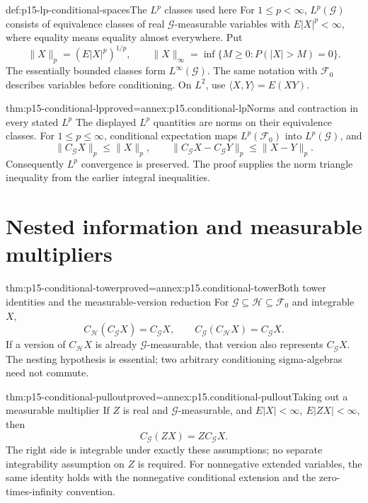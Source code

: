 \begin{hbdefinition}{def:p15-lp-conditional-spaces}{The \(L^p\) classes used here}
For \(1\leq p<\infty\), \(L^p(\mathcal G)\) consists of equivalence
classes of real \(\mathcal G\)-measurable variables with \(E|X|^p<\infty\),
where equality means equality almost everywhere. Put
\[
       \|X\|_p=(E|X|^p)^{1/p},\qquad
       \|X\|_\infty=\inf\{M\geq0:P(|X|>M)=0\}.
\]
The essentially bounded classes form \(L^\infty(\mathcal G)\).
The same notation with \(\mathcal F_0\) describes variables before
conditioning. On \(L^2\), use \(\langle X,Y\rangle=E(XY)\).
\end{hbdefinition}

\begin{hbtheorem}{thm:p15-conditional-lp}{proved=annex:p15.conditional-lp}{Norms and contraction in every stated \(L^p\)}
The displayed \(L^p\) quantities are norms on their equivalence classes.
For \(1\leq p\leq\infty\), conditional expectation maps
\(L^p(\mathcal F_0)\) into \(L^p(\mathcal G)\), and
\[
      \|C_{\mathcal G}X\|_p\leq\|X\|_p,\qquad
      \|C_{\mathcal G}X-C_{\mathcal G}Y\|_p\leq\|X-Y\|_p.
\]
Consequently \(L^p\) convergence is preserved. The proof supplies the
norm triangle inequality from the earlier integral inequalities.
\end{hbtheorem}

\section{Nested information and measurable multipliers}
\label{sec:p15-conditional-tower}

\begin{hbtheorem}{thm:p15-conditional-tower}{proved=annex:p15.conditional-tower}{Both tower identities and the measurable-version reduction}
For \(\mathcal G\subseteq\mathcal H\subseteq\mathcal F_0\) and
integrable \(X\),
\[
 C_{\mathcal H}(C_{\mathcal G}X)=C_{\mathcal G}X,\qquad
 C_{\mathcal G}(C_{\mathcal H}X)=C_{\mathcal G}X.
\]
If a version of \(C_{\mathcal H}X\) is already
\(\mathcal G\)-measurable, that version also represents
\(C_{\mathcal G}X\).
The nesting hypothesis is essential; two arbitrary conditioning
sigma-algebras need not commute.
\end{hbtheorem}

\begin{hbtheorem}{thm:p15-conditional-pullout}{proved=annex:p15.conditional-pullout}{Taking out a measurable multiplier}
If \(Z\) is real and \(\mathcal G\)-measurable, and
\(E|X|<\infty,\ E|ZX|<\infty\), then
\[
                           C_{\mathcal G}(ZX)=ZC_{\mathcal G}X.
\]
The right side is integrable under exactly these assumptions; no separate
integrability assumption on \(Z\) is required.
For nonnegative extended variables, the same identity holds with
the nonnegative conditional extension and the zero-times-infinity convention.
\end{hbtheorem}

